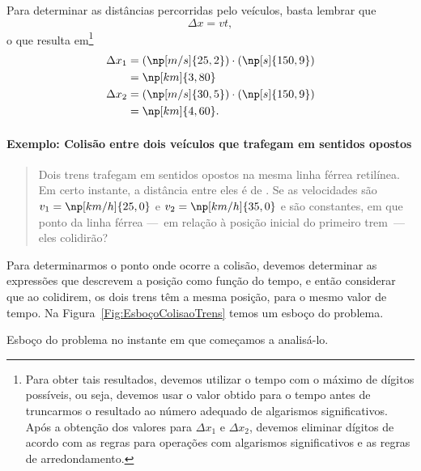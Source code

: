 Para determinar as distâncias percorridas pelo veículos, basta lembrar que
\begin{equation}
	\Delta x = v t,
\end{equation}
%
o que resulta em\footnote{Para obter tais resultados, devemos utilizar o tempo com o máximo de dígitos possíveis, ou seja, devemos usar o valor obtido para o tempo antes de truncarmos o resultado ao número adequado de algarismos significativos. Após a obtenção dos valores para $\Delta x_1$ e $\Delta x_2$, devemos eliminar dígitos de acordo com as regras para operações com algarismos significativos e as regras de arredondamento.}
\begin{align}
	\Delta x_1 &= (\np[m/s]{25,2})\cdot(\np[s]{150,9}) \\
	&= \np[km]{3,80} \\
	\Delta x_2 &= (\np[m/s]{30,5})\cdot(\np[s]{150,9}) \\
	&= \np[km]{4,60}.
\end{align}

\paragraph{Exemplo: Colisão entre dois veículos que trafegam em sentidos opostos}

\begin{quote}
	Dois trens trafegam em sentidos opostos na mesma linha férrea retilínea. Em certo instante, a distância entre eles é de . Se as velocidades são $v_1 = \np[km/h]{25,0}$ e $v_2 = \np[km/h]{35,0}$ e são constantes, em que ponto da linha férrea ---~em relação à posição inicial do primeiro trem~--- eles colidirão?
\end{quote}

Para determinarmos o ponto onde ocorre a colisão, devemos determinar as expressões que descrevem a posição como função do tempo, e então considerar que ao colidirem, os dois trens têm a mesma posição, para o mesmo valor de tempo. Na Figura~\ref{Fig:EsboçoColisaoTrens} temos um esboço do problema.

\begin{marginfigure}
\centering
{}
\caption{Esboço do problema no instante em que começamos a analisá-lo. \label{Fig:EsboçoColisaoTrens}}
\end{marginfigure}

